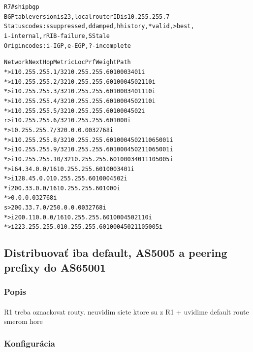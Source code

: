 \documentclass[12pt,twoside,a4paper]{report}
\begin{document}
\noindent
{\selectfont
\begin{small}
\begin{alltt}
R7#sh ip bgp
BGP table version is 23, local router ID is 10.255.255.7
Status codes: s suppressed, d damped, h history, * valid, > best, 
              i - internal, r RIB-failure, S Stale
Origin codes: i - IGP, e - EGP, ? - incomplete

   Network          Next Hop        Metric LocPrf Weight Path
*>i10.255.255.1/32  10.255.255.6         0    100      0 3401 i
*>i10.255.255.2/32  10.255.255.6         0    100      0 4502 110 i
*>i10.255.255.3/32  10.255.255.6         0    100      0 3401 110 i
*>i10.255.255.4/32  10.255.255.6         0    100      0 4502 110 i
*>i10.255.255.5/32  10.255.255.6         0    100      0 4502 i
r>i10.255.255.6/32  10.255.255.6         0    100      0 i
*> 10.255.255.7/32  0.0.0.0              0         32768 i
*>i10.255.255.8/32  10.255.255.6         0    100      0 4502 110 65001 i
*>i10.255.255.9/32  10.255.255.6         0    100      0 4502 110 65001 i
*>i10.255.255.10/32 10.255.255.6         0    100      0 3401 110 5005 i
*>i64.34.0.0/16     10.255.255.6         0    100      0 3401 i
*>i128.45.0.0       10.255.255.6         0    100      0 4502 i
* i200.33.0.0/16    10.255.255.6         0    100      0 i
*>                  0.0.0.0                        32768 i
s> 200.33.7.0/25    0.0.0.0              0         32768 i
*>i200.110.0.0/16   10.255.255.6         0    100      0 4502 110 i
*>i223.255.255.0    10.255.255.6         0    100      0 4502 110 5005 i
\end{alltt}
\end{small}
}




\subsection{Distribuovať iba default, AS5005 a peering prefixy do AS65001}
\subsubsection{Popis}
\paragraph{}
R1 treba oznackovat routy. neuvidim siete ktore su z R1 + uvidime default route smerom hore

\subsubsection{Konfigurácia}
\end{document}
